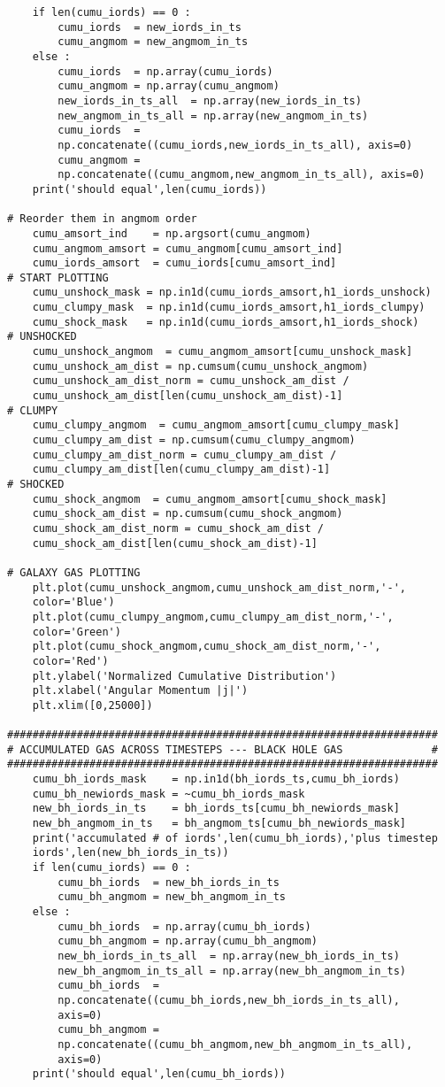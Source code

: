 \documentclass[12pt,headA,chapB]{fiskthesis}
\begin{document}
\begin{verbatim}
    if len(cumu_iords) == 0 :
        cumu_iords  = new_iords_in_ts
        cumu_angmom = new_angmom_in_ts
    else :    
        cumu_iords  = np.array(cumu_iords)
        cumu_angmom = np.array(cumu_angmom)
        new_iords_in_ts_all  = np.array(new_iords_in_ts)
        new_angmom_in_ts_all = np.array(new_angmom_in_ts)
        cumu_iords  = 
        np.concatenate((cumu_iords,new_iords_in_ts_all), axis=0)
        cumu_angmom = 
        np.concatenate((cumu_angmom,new_angmom_in_ts_all), axis=0)
    print('should equal',len(cumu_iords))

# Reorder them in angmom order
    cumu_amsort_ind    = np.argsort(cumu_angmom)
    cumu_angmom_amsort = cumu_angmom[cumu_amsort_ind]
    cumu_iords_amsort  = cumu_iords[cumu_amsort_ind]
# START PLOTTING
    cumu_unshock_mask = np.in1d(cumu_iords_amsort,h1_iords_unshock)
    cumu_clumpy_mask  = np.in1d(cumu_iords_amsort,h1_iords_clumpy)
    cumu_shock_mask   = np.in1d(cumu_iords_amsort,h1_iords_shock)
# UNSHOCKED
    cumu_unshock_angmom  = cumu_angmom_amsort[cumu_unshock_mask]
    cumu_unshock_am_dist = np.cumsum(cumu_unshock_angmom)
    cumu_unshock_am_dist_norm = cumu_unshock_am_dist / 
    cumu_unshock_am_dist[len(cumu_unshock_am_dist)-1]
# CLUMPY
    cumu_clumpy_angmom  = cumu_angmom_amsort[cumu_clumpy_mask]
    cumu_clumpy_am_dist = np.cumsum(cumu_clumpy_angmom)
    cumu_clumpy_am_dist_norm = cumu_clumpy_am_dist / 
    cumu_clumpy_am_dist[len(cumu_clumpy_am_dist)-1]
# SHOCKED
    cumu_shock_angmom  = cumu_angmom_amsort[cumu_shock_mask]
    cumu_shock_am_dist = np.cumsum(cumu_shock_angmom)
    cumu_shock_am_dist_norm = cumu_shock_am_dist / 
    cumu_shock_am_dist[len(cumu_shock_am_dist)-1]

# GALAXY GAS PLOTTING
    plt.plot(cumu_unshock_angmom,cumu_unshock_am_dist_norm,'-',
    color='Blue')
    plt.plot(cumu_clumpy_angmom,cumu_clumpy_am_dist_norm,'-',
    color='Green')
    plt.plot(cumu_shock_angmom,cumu_shock_am_dist_norm,'-',
    color='Red')
    plt.ylabel('Normalized Cumulative Distribution')
    plt.xlabel('Angular Momentum |j|')
    plt.xlim([0,25000])

####################################################################
# ACCUMULATED GAS ACROSS TIMESTEPS --- BLACK HOLE GAS              #
####################################################################
    cumu_bh_iords_mask    = np.in1d(bh_iords_ts,cumu_bh_iords)
    cumu_bh_newiords_mask = ~cumu_bh_iords_mask
    new_bh_iords_in_ts    = bh_iords_ts[cumu_bh_newiords_mask]
    new_bh_angmom_in_ts   = bh_angmom_ts[cumu_bh_newiords_mask]
    print('accumulated # of iords',len(cumu_bh_iords),'plus timestep 
    iords',len(new_bh_iords_in_ts))
    if len(cumu_iords) == 0 :
        cumu_bh_iords  = new_bh_iords_in_ts
        cumu_bh_angmom = new_bh_angmom_in_ts
    else :
        cumu_bh_iords  = np.array(cumu_bh_iords)
        cumu_bh_angmom = np.array(cumu_bh_angmom)
        new_bh_iords_in_ts_all  = np.array(new_bh_iords_in_ts)
        new_bh_angmom_in_ts_all = np.array(new_bh_angmom_in_ts)
        cumu_bh_iords  = 
        np.concatenate((cumu_bh_iords,new_bh_iords_in_ts_all),
        axis=0)
        cumu_bh_angmom = 
        np.concatenate((cumu_bh_angmom,new_bh_angmom_in_ts_all), 
        axis=0)
    print('should equal',len(cumu_bh_iords))


\end{verbatim}
\end{document}
